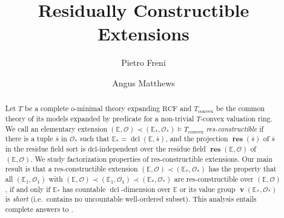 \documentclass{amsart}
\title{Residually Constructible Extensions}
\author{Pietro Freni}
\author{Angus Matthews}
\theoremstyle{remark}
\theoremstyle{definition}
\theoremstyle{plain}
\newcommand{\bE}{\mathbb E}
\newcommand{\cO}{\mathcal O}
\newcommand{\RCF}{\mathrm{RCF}}
\DeclareMathOperator{\val}{\mathbf{v}}
\DeclareMathOperator{\res}{\mathbf{res}}
\DeclareMathOperator{\dcl}{\mathrm{dcl}}
\theoremstyle{plain}
\begin{document}
\begin{abstract}
    Let $T$ be a complete o-minimal theory expanding $\RCF$ and $T_\mathrm{convex}$ be the common theory of its models expanded by predicate for a non-trivial $T$-convex valuation ring.
    We call an elementary extension $(\bE, \cO) \prec (\bE_*, \cO_*) \models T_\mathrm{convex}$ \emph{res-constructible} if there is a tuple $\overline{s}$ in $\cO_*$ such that $\bE_*=\dcl(\bE,\overline{s})$, and the projection $\res(\overline{s})$ of $\overline{s}$ in the residue field sort is $\mathrm{dcl}$-independent over the residue field $\res(\bE, \cO)$ of $(\bE, \cO)$.
    We study factorization properties of res-constructible extensions. Our main result is that a res-constructible extension $(\bE, \cO) \prec (\bE_*, \cO_*)$ has the property that all $(\bE_1, \cO_1)$ with $(\bE, \cO) \prec (\bE_1, \cO_1) \prec (\bE_*, \cO_*)$ are res-constructible over $(\bE, \cO)$, if and only if $\bE_*$ has countable $\dcl$-dimension over $\bE$ or its value group $\val(\bE_*, \cO_*)$ is \emph{short} (i.e.\ contains no uncountable well-ordered subset).
    This analysis entails complete answers to \cite[Problem~5.12]{tressl2006pseudo}.
\end{abstract}

\end{document}
